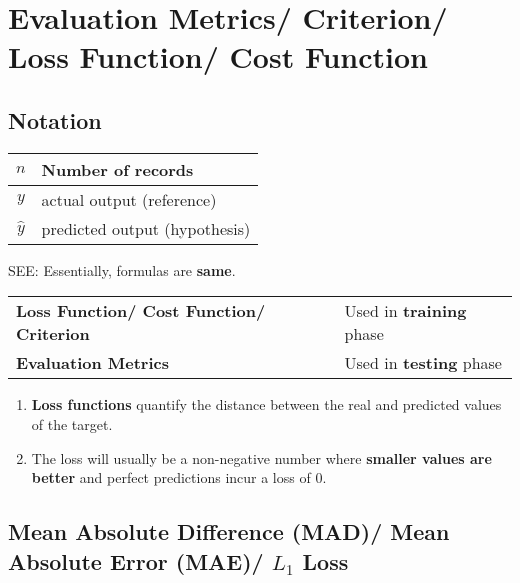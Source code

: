 \chapter{Evaluation Metrics/ Criterion/ Loss Function/ Cost Function}

\section*{Notation}
\begin{table}[h]
    \begin{tabular}{|c|l|}
        \hline
        
       $n$  & Number of records \\ 
       \hline
       
       $y$ & actual output (reference) \\ 
       \hline
       
       $\hat{y}$ & predicted output (hypothesis) \\ 
       \hline 
       
    \end{tabular}
\end{table}

SEE: 
Essentially, formulas are \textbf{same}.

\begin{table}[h]
    \begin{tabular}{l l}
        \textbf{Loss Function/ Cost Function/ Criterion} & Used in \textbf{training} phase \\
        
        \textbf{Evaluation Metrics} & Used in \textbf{testing} phase \\
    \end{tabular}
\end{table}


\begin{enumerate}
    \item \textbf{Loss functions} quantify the distance between the real and predicted values of the target. 
    
    \item The loss will usually be a non-negative number where \textbf{smaller values are better} and perfect predictions incur a loss of $0$.

\end{enumerate}

\section{Mean Absolute Difference (MAD)/ Mean Absolute Error (MAE)/ $L_1$ Loss}\label{Mean Absolute Difference (MAD)}\label{Mean Absolute Error (MAE)}\label{L1 Loss}

